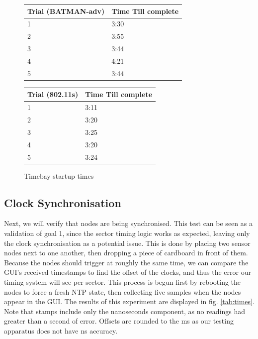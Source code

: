 \documentclass[journal]{IEEEtran}
\begin{document}
\begin{figure}[t]
\begin{tabular}{|l|l|}
\hline
\textbf{Trial (BATMAN-adv)} & \textbf{Time Till complete} \\ \hline
1              & 3:30                        \\ \hline
2              & 3:55                        \\ \hline
3              & 3:44                        \\ \hline
4              & 4:21                        \\ \hline
5              & 3:44                        \\ \hline
\end{tabular}

\begin{tabular}{|l|l|}
\hline
\textbf{Trial (802.11s)} & \textbf{Time Till complete} \\ \hline
1              & 3:11                        \\ \hline
2              & 3:20                        \\ \hline
3              & 3:25                        \\ \hline
4              & 3:20                        \\ \hline
5              & 3:24                        \\ \hline
\end{tabular}
\caption{Timebay startup times}
\label{tab:startup}
\end{figure}

\subsection{Clock Synchronisation}
Next, we will verify that nodes are being synchronised. This test can be seen as a validation of goal 1, since the sector timing logic works as expected, leaving only the clock synchronisation as a potential issue. This is done by placing two sensor nodes next to one another, then dropping a piece of cardboard in front of them. Because the nodes should trigger at roughly the same time, we can compare the GUI's received timestamps to find the offset of the clocks, and thus the error our timing system will see per sector. This process is begun first by rebooting the nodes to force a fresh NTP state, then collecting five samples when the nodes appear in the GUI. The results of this experiment are displayed in fig. \ref{tab:times}. Note that stamps include only the nanoseconds component, as no readings had greater than a second of error. Offsets are rounded to the ms as our testing apparatus does not have ns accuracy. 
\end{document}
